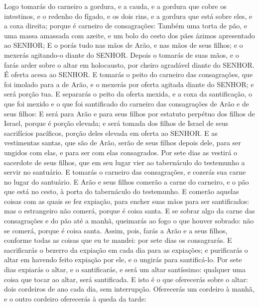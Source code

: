 {{  Logo tomarás do carneiro a gordura, e a cauda, e a gordura que cobre os intestinos, e o redenho do fígado, e os dois rins, e a gordura que está sobre eles, e a coxa direita; porque é carneiro de consagrações:
  Também uma torta de pão, e uma massa amassada com azeite, e um bolo do cesto dos pães ázimos apresentado ao SENHOR;
  E o porás tudo nas mãos de Arão, e nas mãos de seus filhos; e o mexerás agitando-o diante do SENHOR.
  Depois o tomarás de suas mãos, e o farás arder sobre o altar em holocausto, por cheiro agradável diante do SENHOR. É oferta acesa ao SENHOR.
  E tomarás o peito do carneiro das consagrações, que foi imolado para a de Arão, e o mexerás por oferta agitada diante do SENHOR; e será porção tua.
  E separarás o peito da oferta mexida, e a coxa da santificação, o que foi mexido e o que foi santificado do carneiro das consagrações de Arão e de seus filhos:
  E será para Arão e para seus filhos por estatuto perpétuo dos filhos de Israel, porque é porção elevada; e será tomada dos filhos de Israel de seus sacrifícios pacíficos, porção deles elevada em oferta ao SENHOR.
  E as vestimentas santas, que são de Arão, serão de seus filhos depois dele, para ser ungidos com elas, e para ser com elas consagrados.
  Por sete dias as vestirá o sacerdote de seus filhos, que em seu lugar vier ao tabernáculo do testemunho a servir no santuário.
  E tomarás o carneiro das consagrações, e cozerás sua carne no lugar do santuário.
  E Arão e seus filhos comerão a carne do carneiro, e o pão que está no cesto, à porta do tabernáculo do testemunho.
  E comerão aquelas coisas com as quais se fez expiação, para encher suas mãos para ser santificados: mas o estrangeiro não comerá, porque é coisa santa.
  E se sobrar algo da carne das consagrações e do pão até a manhã, queimarás ao fogo o que houver sobrado: não se comerá, porque é coisa santa.
  Assim, pois, farás a Arão e a seus filhos, conforme todas as coisas que eu te mandei: por sete dias os consagrarás.
  E sacrificarás o bezerro da expiação em cada dia para as expiações; e purificarás o altar em havendo feito expiação por ele, e o ungirás para santificá-lo.
  Por sete dias expiarás o altar, e o santificarás, e será um altar santíssimo: qualquer uma coisa que tocar ao altar, será santificada. %
  E isto é o que oferecerás sobre o altar: dois cordeiros de ano cada dia, sem interrupção.
  Oferecerás um cordeiro à manhã, e o outro cordeiro oferecerás à queda da tarde:
}}
